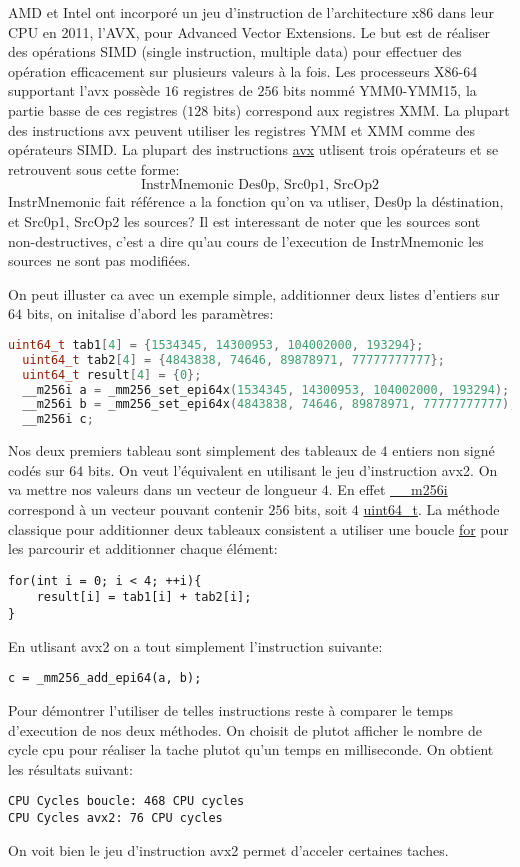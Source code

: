 \documentclass[12pt]{article}
\begin{document}
AMD et Intel ont incorporé un jeu d'instruction de l'architecture x86 dans leur CPU en 2011, l'AVX, pour Advanced Vector Extensions. Le but est de réaliser des opérations SIMD (single instruction, multiple data) pour effectuer des opération efficacement sur plusieurs valeurs à la fois.
\newline 
Les processeurs X86-64 supportant l'avx possède $16$ registres de $256$ bits nommé YMM0-YMM15, la partie basse de ces registres ($128$ bits) correspond aux registres XMM. La plupart des instructions avx peuvent utiliser les registres YMM et XMM comme des opérateurs SIMD. La plupart des instructions \url{avx} utlisent trois opérateurs et se retrouvent sous cette forme:
$$ \text{InstrMnemonic Des0p, Src0p1, SrcOp2} $$ 
InstrMnemonic fait référence a la fonction qu'on va utliser, Des0p la déstination, et Src0p1, SrcOp2 les sources? Il est interessant de noter que les sources sont non-destructives, c'est a dire qu'au cours de l'execution de InstrMnemonic les sources ne sont pas modifiées.


On peut illuster ca avec un exemple simple, additionner deux listes d'entiers sur $64$ bits, on initalise d'abord les paramètres:
\medskip
\begin{lstlisting}[language = c]
  uint64_t tab1[4] = {1534345, 14300953, 104002000, 193294};
  uint64_t tab2[4] = {4843838, 74646, 89878971, 77777777777};
  uint64_t result[4] = {0};
  __m256i a = _mm256_set_epi64x(1534345, 14300953, 104002000, 193294);
  __m256i b = _mm256_set_epi64x(4843838, 74646, 89878971, 77777777777);
  __m256i c;
\end{lstlisting}
Nos deux premiers tableau sont simplement des tableaux de $4$ entiers non signé codés sur $64$ bits. On veut l'équivalent en utilisant le jeu d'instruction avx2. On va mettre nos valeurs dans un vecteur de longueur $4$. En effet \url{__m256i} correspond à un vecteur pouvant contenir $256$ bits, soit $4$ \url{uint64_t}.
La méthode classique pour additionner deux tableaux consistent a utiliser une boucle \url{for} pour les parcourir et additionner chaque élément:
\medskip
\begin{lstlisting}
for(int i = 0; i < 4; ++i){
    result[i] = tab1[i] + tab2[i];
} 
\end{lstlisting}
En utlisant avx2 on a tout simplement l'instruction suivante: 
\medskip
\begin{lstlisting}
c = _mm256_add_epi64(a, b);
\end{lstlisting}
Pour démontrer l'utiliser de telles instructions reste à comparer le temps d'execution de nos deux méthodes. On choisit de plutot afficher le nombre de cycle cpu pour réaliser la tache plutot qu'un temps en milliseconde. On obtient les résultats suivant:
\begin{lstlisting}
CPU Cycles boucle: 468 CPU cycles
CPU Cycles avx2: 76 CPU cycles
\end{lstlisting}
On voit bien le jeu d'instruction avx2 permet d'acceler certaines taches. 
\newpage
%
%
\end{document}

